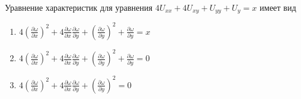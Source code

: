 Уравнение характеристик для уравнения \(4U_{xx}+4U_{xy}+U_{yy}+U_y=x\) имеет вид

\begin{enumerate}[label=\arabic*)]
    \item \(4\left(\frac{\partial \omega }{\partial x}\right)^2+4\frac{\partial \omega }{\partial x}\frac{\partial \omega }{\partial y}+\left(\frac{\partial \omega }{\partial y}\right)^2+\frac{\partial \omega }{\partial y}=x\)
    \item \(4\left(\frac{\partial \omega }{\partial x}\right)^2+4\frac{\partial \omega }{\partial x}\frac{\partial \omega }{\partial y}+\left(\frac{\partial \omega }{\partial y}\right)^2+\frac{\partial \omega }{\partial y}=0\)
    \item \(4\left(\frac{\partial \omega }{\partial x}\right)^2+4\frac{\partial \omega }{\partial x}\frac{\partial \omega }{\partial y}+\left(\frac{\partial \omega }{\partial y}\right)^2=0\)
\end{enumerate}

